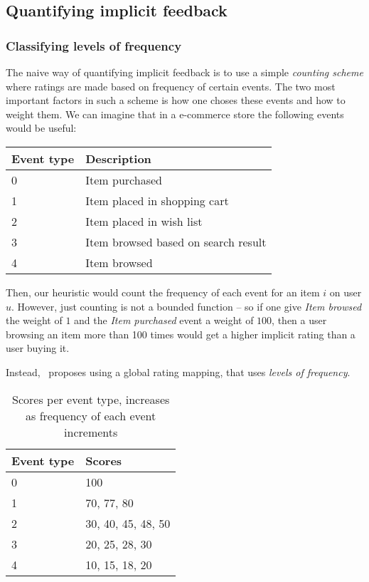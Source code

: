 \clearpage

\subsection{Quantifying implicit feedback}

\subsubsection{Classifying levels of frequency}

The naive way of quantifying implicit feedback is to use a simple
\textit{counting scheme} where ratings are made based on frequency of certain
events. The two most important factors in such a scheme is how one choses these
events and how to weight them. We can imagine that in a e-commerce store the
following events would be useful:

\begin{table}[H]
  \centering
  \begin{tabular}{ll}
  \toprule
  Event type & Description \\ \midrule
  0 & Item purchased \\
  1 & Item placed in shopping cart \\
  2 & Item placed in wish list \\
  3 & Item browsed based on search result \\
  4 & Item browsed \\
  \bottomrule
  \end{tabular}
\end{table}

Then, our heuristic would count the frequency of each event for an item $i$ on
user $u$. However, just counting is not a bounded function – so if one give
\textit{Item browsed} the weight of $1$ and the \textit{Item purchased} event
a weight of $100$, then a user browsing an item more than 100 times would get a
higher implicit rating than a user buying it.

Instead,~\cite{pkghost2014implicit} proposes using a global rating mapping,
that uses \textit{levels of frequency}.

\begin{table}[H]
  \centering
  \begin{tabular}{ll}
  \toprule
  Event type & Scores \\ \midrule
  0 & 100 \\
  1 & 70, 77, 80 \\
  2 & 30, 40, 45, 48, 50 \\
  3 & 20, 25, 28, 30 \\
  4 & 10, 15, 18, 20 \\
  \bottomrule
  \end{tabular}
  \caption{Scores per event type, increases as frequency of each event
           increments}
\label{implicit-table}
\end{table}

